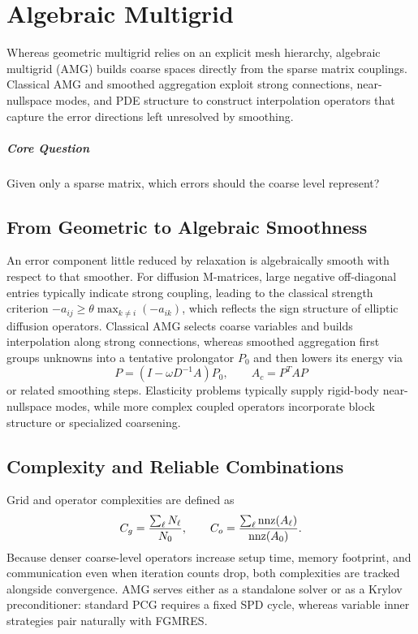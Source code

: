 \chapter{Algebraic Multigrid}\label{v0ch:20}
\begin{chaptersummary}
Whereas geometric multigrid relies on an explicit mesh hierarchy, algebraic multigrid (AMG) builds coarse spaces directly from the sparse matrix couplings. Classical AMG and smoothed aggregation exploit strong connections, near-nullspace modes, and PDE structure to construct interpolation operators that capture the error directions left unresolved by smoothing.
\end{chaptersummary}
\paragraph{Core Question}Given only a sparse matrix, which errors should the coarse level represent?

\section{From Geometric to Algebraic Smoothness}
An error component little reduced by relaxation is algebraically smooth with respect to that smoother. For diffusion M-matrices, large negative off-diagonal entries typically indicate strong coupling, leading to the classical strength criterion
$-a_{ij}\ge\theta\max_{k\ne i}(-a_{ik})$,
which reflects the sign structure of elliptic diffusion operators.
Classical AMG selects coarse variables and builds interpolation along strong connections, whereas smoothed aggregation first groups unknowns into a tentative prolongator $P_0$ and then lowers its energy via
\[
 P=(I-\omega D^{-1}A)P_0,\qquad A_c=P^TAP
\]
or related smoothing steps. Elasticity problems typically supply rigid-body near-nullspace modes, while more complex coupled operators incorporate block structure or specialized coarsening.
\section{Complexity and Reliable Combinations}
Grid and operator complexities are defined as
\[
 C_g=\frac{\sum_\ell N_\ell}{N_0},\qquad
 C_o=\frac{\sum_\ell\operatorname{nnz}(A_\ell)}{\operatorname{nnz}(A_0)}.
\]
Because denser coarse-level operators increase setup time, memory footprint, and communication even when iteration counts drop, both complexities are tracked alongside convergence. AMG serves either as a standalone solver or as a Krylov preconditioner: standard PCG requires a fixed SPD cycle, whereas variable inner strategies pair naturally with FGMRES.
